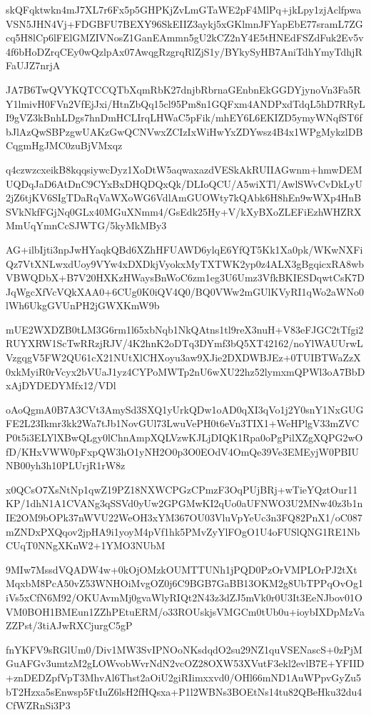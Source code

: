 \documentclass[]{article}
\newenvironment{Shaded}{\begin{snugshade}}{\end{snugshade}}
\newcommand{\NormalTok}[1]{#1}
\begin{document}
\begin{Shaded}
\begin{Highlighting}[]
\NormalTok{skQFqktwkn4mJ7XL7r6Fx5p5GHPKjZvLmGTaWE2pF4MlPq+jkLpy1zjAclfpwaVSN5JHN4Vj+FDGBFU7BEXY96SkEIIZ3aykj5xGKlmnJFYapEbE77sramL7ZGcq5H8lCp6lFElGMZIVNosZ1GanEAmmn5gU2kCZ2nY4E5tHNEdFSZdFuk2Ev5v4f6bHoDZrqCEy0wQzlpAx07AwqgRzgrqRlZjS1y/BYkySyHB7AniTdhYmyTdhjRFaUJZ7nrjA}

\NormalTok{JA7B6TwQVYKQTCCQTbXqmRbK27dnjbRbrnaGEnbnEkGGDYjynoVn3Fa5RY1lmivH0FVn2VfEjJxi/HtnZbQq15cl95Pm8n1GQFxm4ANDPxdTdqL5hD7RRyLI9gVZ3kBnhLDgs7hnDmHCLIrqLHWaC5pFik/mhEY6L6EKIZD5ymyWNqfST6fbJlAzQwSBPzgwUAKzGwQCNVwxZCIzIxWiHwYxZDYwsz4B4x1WPgMykzlDBCqgmHgJMC0zuBjVMxqz}

\NormalTok{q4czwzcxeikB8kqqsiywcDyz1XoDtW5aqwaxazdVESkAkRUIIAGwnm+hmwDEMUQDqJaD6AtDnC9CYxBxDHQDQxQk/DLIoQCU/A5wiXTl/AwlSWvCvDkLyU2jZ6tjKV6SIgTDaRqVaWXoWG6VdlAmGUOWty7kQAbk6H8hEn9wWXp4HnBSVkNkfFGjNq0GLx40MGuXNmm4/GsEdk25Hy+V/kXyBXoZLEFiEzhWHZRXMmUqYmnCcSJWTG/5kyMkMBy3}

\NormalTok{AG+ilbIjti3npJwHYaqkQBd6XZhHFUAWD6ylqE6YfQT5Kk1Xa0pk/WKwNXFiQz7VtXNLwxdUoy9VYw4xDXDkjVyokxMyTXTWK2yp0z4ALX3gBgqicxRA8wbVBWQDbX+B7V20HXKzHWaysBnWoC6zm1eg3U6Umz3VfkBKIESDqwtCsK7DJqWgcXfVcVQkXAA0+6CUg0K0iQV4Q0/BQ0VWw2mGUlKVyRI1qWo2aWNo0lWh6UkgGVUnPH2jGWXKmW9b}

\NormalTok{mUE2WXDZB0tLM3G6rm1l65xbNqb1NkQAtns1tl9reX3nuH+V83eFJGC2tTfgi2RUYXRW1ScTwRRzjRJV/4K2hnK2oDTq3DYmf3bQ5XT42162/noYlWAUUrwLVzgqgV5FW2QU61cX21NUtXlCHXoyu3aw9XJie2DXDWBJEz+0TUIBTWaZzX0xkMyiR0rVcyx2bVUaJ1yz4CYPoMWTp2nU6wXU22hz52lymxmQPWl3oA7BbDxAjDYDEDYMfx12/VDl}

\NormalTok{oAoQgmA0B7A3CVt3AmySd3SXQ1yUrkQDw1oAD0qXI3qVo1j2Y0snY1NxGUGFE2L23Ikmr3kk2Wa7tJb1NovGUl73LwuVePH0t6eVn3TIX1+WeHPlgV33mZVCP0t5i3ELYlXBwQLgy0lChnAmpXQLVzwKJLjDIQK1Rpa0oPgPilXZgXQPG2wOfD/KHxVWW0pFxpQW3hO1yNH2O0p3O0EOdV4OmQe39Ve3EMEyjW0PBIUNB00yh3h10PLUrjR1rW8z}

\NormalTok{x0QCsO7XsNtNp1qwZ19PZ18NXWCPGzCPmzF3OqPUjBRj+wTieYQztOur11KP/1dhN1A1CVANg3qSSVd0yUw2GPGMwKI2qUo0aUFNWO3U2MNw40z3b1nIE2OM9bOPk37nWVU22WeOH3xYM367OU03VluVpYeUc3n3FQ82PnX1/oC087mZNDxPXQqov2jpHA9i1yoyM4pVf1hk5PMvZyYlFOgO1U4oFUSlQNG1RE1NbCUqT0NNgXKnW2+1YMO3NUbM}

\NormalTok{9MIw7MssdVQADW4w+0kOjOMzkOUMTTUNh1jPQD0PzOrVMPLOrPJ2tXtMqxbM8PcA50vZ53WNHOiMvgOZ0j6C9BGB7GaBB13OKM2g8UbTPPqOvOg1iVs5xCfN6M92/OKUAvmMj0gvaWlyRIQt2N43z3dZJ5mVk0r0U3It3EeNJbov01OVM0BOH1BMEun1ZZhPEtuERM/o33ROUskjsVMGCm0tUb0u+ioybIXDpMzVaZZPst/3tiAJwRXCjurgC5gP}

\NormalTok{fnYKFV9sRGlUm0/Div1MW3SvIPNOoNKsdqdO2su29NZ1quVSENascS+0zPjMGuAFGv3umtzM2gLOWvobWvrNdN2vcOZ28OXW53XVutF3ekl2evlB7E+YFIID+znDEDZpfVpT3MhvAl6Thst2aOiU2giRIimxxvd0/OHl66mND1AuWPpvGyZu5bT2Hzxa5sEnwsp5FtIuZ6lsH2fHQsxa+P1l2WBNs3BOEtNs14tu82QBeHku32du4CfWZRnSi3P3}


\end{Highlighting}
\end{Shaded}
\end{document}
